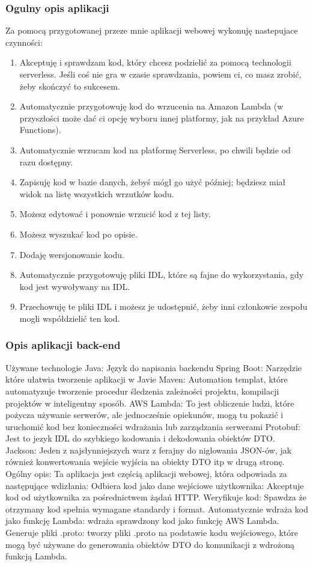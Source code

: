 \documentclass[runningheads,12pt]{llncs}
\begin{document}
\subsubsection{Ogulny opis aplikacji}

Za pomocą  przygotowanej przeze mnie aplikacji webowej wykonuję nastepujace czynności:

\begin{enumerate}
    \item Akceptuję i sprawdzam kod, który chcesz podzielić za pomocą technologii serverless. Jeśli coś nie gra w czasie sprawdzania, powiem ci, co masz zrobić, żeby skończyć to sukcesem.
    \item Automatycznie przygotowuję kod do wrzucenia na Amazon Lambda (w przyszłości może dać ci opcję wyboru innej platformy, jak na przykład Azure Functions).
    \item Automatycznie wrzucam kod na platformę Serverless, po chwili będzie od razu dostępny.
    \item Zapisuję kod w bazie danych, żebyś mógł go użyć później; będziesz miał widok na listę wszystkich wrzutków kodu.
    \item Możesz edytować i ponownie wrzucić kod z tej listy.
    \item Możesz wyszukać kod po opisie.
    \item Dodaję wersjonowanie kodu.
    \item Automatycznie przygotowuję pliki IDL, które są fajne do wykorzystania, gdy kod jest wywoływany na IDL.
    \item Przechowuję te pliki IDL i możesz je udostępnić, żeby inni członkowie zespołu mogli współdzielić ten kod.
\end{enumerate}

\subsubsection{Opis aplikacji back-end}

Używane technologie
Java: Język do napisania backendu
Spring Boot: Narzędzie które ułatwia tworzenie aplikacji w Javie
Maven: Automation templat, które automatyzuje tworzenie procedur śledzenia zależności projektu, kompilacji projektów w inteligentny sposób.
AWS Lambda: To jest obliczenie ludzi, które pożycza używanie serwerów, ale jednocześnie opiekunów, mogą tu pokazić i uruchomić kod bez konieczności wdrażania lub zarządzania serwerami
Protobuf: Jest to jezyk IDL do szybkiego kodowania i dekodowania obiektów DTO.
Jackson: Jeden z najsłynniejszych warz z ferajny do niglowania JSON-ów, jak również konwertowania wejście wyjścia na obiekty DTO itp w drugą stronę.
Ogólny opis:
Ta aplikacja jest częścią aplikacji webowej, która odpowiada za następujące wdizłania:
Odbiera kod jako dane wejściowe użytkownika: Akceptuje kod od użytkownika za pośrednictwem żądań HTTP.
Weryfikuje kod: Spawdza że otrzymany kod spełnia wymagane standardy i format.
Automatycznie wdraża kod jako funkcję Lambda: wdraża sprawdzony kod jako funkcję AWS Lambda.
Generuje pliki .proto: tworzy pliki .proto na podstawie kodu wejściowego, które mogą być używane do generowania obiektów DTO do komunikacji z wdrożoną funkcją Lambda.
\end{document}
